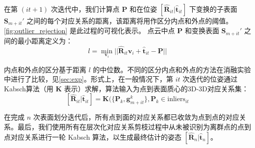 在第 $(it+1)$ 次迭代中，我们计算点 $\mathbf{P}$ 和在位姿 $[\hat{\mathbf{R}}_{it}|\hat{\mathbf{t}}_{it}]$ 下变换的子表面 $\mathbf{S}_{m+it}'$ 之间的每个对应关系的距离，该距离将用作区分内点和外点的阈值。\autoref{fig:outlier_rejection} 是此过程的可视化表示。
点云中点 $\mathbf{P}$ 和变换表面 $\mathbf{S}_{m+it}'$ 之间的最小距离定义为：
\begin{equation}
\label{eq:l}
l = \min\limits_{\mathbf{v}_i} ||\hat{\mathbf{R}}_{it} \mathbf{v}_{i} + \hat{\mathbf{t}}_{it}-\mathbf{P}||
\end{equation}

内点和外点的区分基于距离 $l$ 的中位数。不同的区分内点和外点的方法在消融实验中进行了比较，见\autoref{sec:exp}。形式上，在一般情况下，第 $it$ 次迭代的位姿通过 Kabsch算法（用 $\mathbf{K}$ 表示）求解，算法输入为点到表面质心的3D-3D对应关系集：
\begin{equation}
    \label{eq:posekabsch}
    [\hat{\mathbf{R}}_{it}|\hat{\mathbf{t}}_{it}] = \mathbf{K}(\{\mathbf{P}_{k}, \mathbf{g}_{m+it}^{k}\}, {\mathbf{P}_{k}\in \text{inliers}_{it}}
\end{equation}

在完成 $n$ 次表面划分迭代后，所有点到面的对应关系都已收敛为点到点的对应关系。最后，我们使用所有在层次化对应关系剪枝过程中从未被识别为离群点的点到点对应关系进行一轮 Kabsch 算法，以生成最终估计的姿态 $[\hat{\mathbf{R}}_{n}|\hat{\mathbf{t}}_{n}]$。
